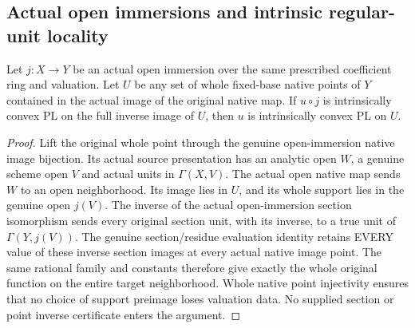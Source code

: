 \subsection{Actual open immersions and intrinsic regular-unit locality}
\begin{lemma}
\label{scheme:native-unit-open-immersion-descent}
\leanok
{}
Let $j:X\to Y$ be an actual open immersion over the same prescribed coefficient
ring and valuation. Let $U$ be any set of whole fixed-base native points of $Y$
contained in the actual image of the original native map. If $u\circ j$ is
intrinsically convex PL on the full inverse image of $U$, then $u$ is
intrinsically convex PL on $U$.
\end{lemma}
\begin{proof}
Lift the original whole point through the genuine open-immersion native image
bijection. Its actual source presentation has an analytic open $W$, a genuine
scheme open $V$ and actual units in $\Gamma(X,V)$. The actual open native map
sends $W$ to an open neighborhood. Its image lies in $U$, and its whole support
lies in the genuine open $j(V)$. The inverse of the actual open-immersion
section isomorphism sends every original section unit, with its inverse, to a
true unit of $\Gamma(Y,j(V))$. The genuine section/residue evaluation identity
retains EVERY value of these inverse section images at every actual native
image point. The same rational family and constants therefore give exactly
the whole original function on the entire target neighborhood. Whole native
point injectivity ensures that no choice of support preimage loses valuation
data. No supplied section or point inverse certificate enters the argument.
\end{proof}

